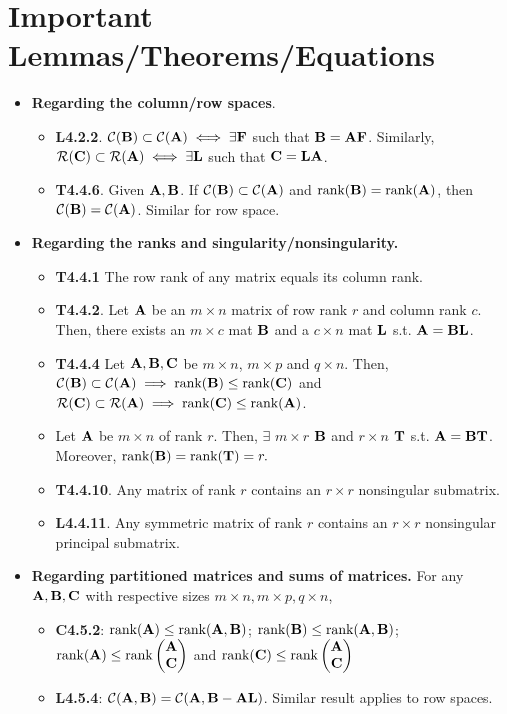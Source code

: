 \documentclass[a4paper, oneside]{book}
\begin{document}
\section{Important Lemmas/Theorems/Equations}
\begin{itemize}
\item \textbf{Regarding the column/row spaces}.
	\begin{itemize}
	\item \textbf{L4.2.2}. $\mathcal{C}(\mathbf{B}) \subset \mathcal{C}(\mathbf{A}) \iff \exists \mathbf F $ such that $\mathbf{B=AF}$. Similarly, $\mathcal{R}(\mathbf{C}) \subset \mathcal{R}(\mathbf{A}) \iff \exists \mathbf L$ such that $\mathbf{C} = \mathbf{LA}$.
	\item \textbf{T4.4.6}. Given $\mathbf{A,B}$. If $\mathcal{C}(\mathbf B) \subset \mathcal{C}(\mathbf A)$ and $\text{rank}(\mathbf B) = \text{rank}(\mathbf A)$, then $\mathcal{C}(\mathbf B)=\mathcal{C}(\mathbf A)$. Similar for row space.
	\end{itemize}
\item \textbf{Regarding the ranks and singularity/nonsingularity.}
	\begin{itemize}
	\item \textbf{T4.4.1} The row rank of any matrix equals its column rank.
	\item \textbf{T4.4.2}. Let $\mathbf A$ be an $m\times n$ matrix of row rank $r$ and column rank $c$. Then, there exists an $m\times c$ mat $\mathbf B$ and a $c\times n$ mat $\mathbf L$ s.t. $\mathbf{A=BL}$.
	\item \textbf{T4.4.4} Let $\mathbf{A,B,C}$ be $m\times n$, $m \times p$ and $q\times n$. Then, 	$\mathcal{C}(\mathbf{B}) \subset \mathcal{C}(\mathbf{A}) \implies \text{rank}(\mathbf B) \le \text{rank}(\mathbf C)$ and $\mathcal{R}(\mathbf{C}) \subset \mathcal{R}(\mathbf{A}) \implies \text{rank}(\mathbf C) \le \text{rank}(\mathbf A) $.
	\item Let $\mathbf A$ be $m\times n $ of rank $r$. Then, $\exists$ $m\times r$ $\mathbf{B}$ and $r\times n$ $\mathbf{T}$ s.t. $\mathbf{A = BT}$. Moreover, $\text{rank}(\mathbf B) = \text{rank}(\mathbf T) = r.$
	\item \textbf{T4.4.10}. Any matrix of rank $r$ contains an $r\times r$ nonsingular submatrix.
	\item \textbf{L4.4.11}. Any symmetric matrix of rank $r$ contains an $r\times r$ nonsingular principal submatrix.
	\end{itemize}
\item \textbf{Regarding partitioned matrices and sums of matrices.} For any $\mathbf{A,B,C}$ with respective sizes $m\times n, m\times p, q\times n$,
	\begin{itemize}
	\item \textbf{C4.5.2}: $\text{rank}(\mathbf A) \le \text{rank}(\mathbf{A,B})$; $\text{rank}(\mathbf B) \le \text{rank}(\mathbf{A,B})$; $\text{rank}(\mathbf A) \le \text{rank}\left(\begin{matrix} \mathbf A \\ \mathbf C\end{matrix}\right)$ and $\text{rank}(\mathbf C) \le \text{rank}\left(\begin{matrix} \mathbf A \\ \mathbf C\end{matrix}\right)$
	\item \textbf{L4.5.4}: $\mathcal{C}(\mathbf{A,B}) = \mathcal{C}(\mathbf{A, B-AL})$. Similar result applies to row spaces.
	\end{itemize}
\end{itemize}
\end{document}
